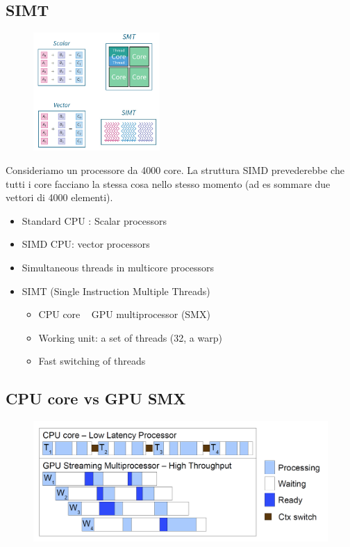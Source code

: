 \subsection{SIMT}


\begin{figure}
	\begin{center}
		\includegraphics[width=0.43\textwidth]{figure_parallel/simt.png}
	\end{center}
\end{figure}

Consideriamo un processore da 4000 core. La struttura SIMD prevederebbe che tutti i core facciano la stessa cosa nello stesso momento (ad es sommare due vettori di 4000 elementi).



\begin{itemize}
	\item Standard CPU : Scalar processors
	\item SIMD CPU: vector processors
	\item Simultaneous threads in multicore processors
	\item SIMT (Single Instruction Multiple	Threads)
	\begin{itemize}
		\item CPU core ~ GPU multiprocessor (SMX)
		\item Working unit: a set of threads (32, a warp)
		\item Fast switching of threads
	\end{itemize}
\end{itemize}

\subsection{CPU core vs GPU SMX}

\begin{figure}[ht]
	\centering
	\includegraphics[width=1\textwidth]{figure_parallel/core_vs_smx.png}
\end{figure}
\FloatBarrier


